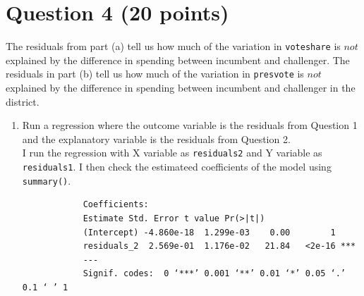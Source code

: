 \documentclass[12pt,letterpaper]{article}
\begin{document}
	

\newpage	
\section*{Question 4 (20 points)}
\noindent The residuals from part (a) tell us how much of the variation in \texttt{voteshare} is $not$ explained by the difference in spending between incumbent and challenger. The residuals in part (b) tell us how much of the variation in \texttt{presvote} is $not$ explained by the difference in spending between incumbent and challenger in the district.
	\begin{enumerate}
		\item Run a regression where the outcome variable is the residuals from Question 1 and the explanatory variable is the residuals from Question 2.\\
		I run the regression with X variable as \texttt{residuals2} and Y variable as \texttt{residuals1}. I then check the estimateed coefficients of the model using \texttt{summary()}.\\
		
		\begin{footnotesize}
			\begin{verbatim}
			Coefficients:
			Estimate Std. Error t value Pr(>|t|)    
			(Intercept) -4.860e-18  1.299e-03    0.00        1    
			residuals_2  2.569e-01  1.176e-02   21.84   <2e-16 ***
			---
			Signif. codes:  0 ‘***’ 0.001 ‘**’ 0.01 ‘*’ 0.05 ‘.’ 0.1 ‘ ’ 1
			

\end{verbatim}
\end{footnotesize}
\end{enumerate}
\end{document}
